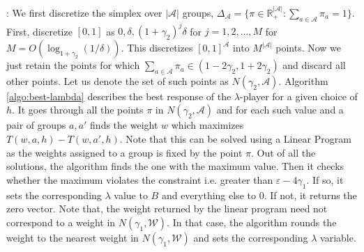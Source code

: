 \documentclass[11pt]{article}
\newcommand{\set}[1]{\{#1\}}
\newcommand{\bbR}{\mathbb{R}}
\newcommand{\WW}{\mathcal{W}}
\newcommand{\abs}[1]{\left|#1\right|}
\newcommand{\Ac}{\mathcal{A}}
\newcommand{\eps}{\varepsilon}
\begin{document}
: We first discretize the simplex over $\abs{\Ac}$ groups, $\Delta_{\Ac} = \set{\pi \in \bbR^{\abs{\Ac}}_+: \sum_{a \in \Ac} \pi_a = 1}$. First, discretize $[0,1]$ as $0,\delta, (1+\gamma_2)^j \delta$ for $j=1,2,\ldots,M$ for $M = O(\log_{1+\gamma_2}(1/\delta))$. This discretizes $[0,1]^{\Ac}$ into $M^{\abs{\Ac} }$ points. Now we just retain the points for which $\sum_{a\in \Ac} \pi_a \in (1-2\gamma_2,1+2\gamma_2)$ and discard all other points. Let us denote the set of such points as $N(\gamma_2,\Ac)$. Algorithm \ref{algo:best-lambda} describes the best response of the $\lambda$-player for a given choice of $h$. It goes through all the points $\pi$ in $N(\gamma_2,\Ac)$ and for each such value and a pair of groups $a,a'$ finds the weight $w$ which maximizes $T(w,a,h) - T(w,a',h)$. Note that this can be solved using a Linear Program as the weights assigned to a group is fixed by the point $\pi$. Out of all the solutions, the algorithm finds the one with the maximum value. Then it checks whether the maximum violates the constraint i.e. greater than $\eps - 4\gamma_1$. If so, it sets the corresponding $\lambda$ value to $B$ and everything else to $0$. If not, it returns the zero vector. Note that, the weight returned by the linear program need not correspond to a weight in $N(\gamma_1, \WW)$. In that case, the algorithm rounds the weight to the nearest weight in $N(\gamma_1,\WW)$ and sets the corresponding $\lambda$ variable.
\end{document}
